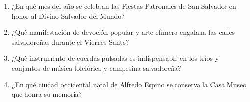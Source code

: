 \documentclass[10pt,a4paper]{article}
\begin{document}
\begin{enumerate}[label=\textbf{\arabic*.}]
\vspace{0.15cm}
\item ¿En qué mes del año se celebran las Fiestas Patronales de San Salvador en honor al Divino Salvador del Mundo?
\begin{enumerate}[label=\textbf{\Alph*)}]
\end{enumerate}
\vspace{0.15cm}
\item ¿Qué manifestación de devoción popular y arte efímero engalana las calles salvadoreñas durante el Viernes Santo?
\begin{enumerate}[label=\textbf{\Alph*)}]
\end{enumerate}
\vspace{0.15cm}
\item ¿Qué instrumento de cuerdas pulsadas es indispensable en los tríos y conjuntos de música folclórica y campesina salvadoreña?
\begin{enumerate}[label=\textbf{\Alph*)}]
\end{enumerate}
\vspace{0.15cm}
\item ¿En qué ciudad occidental natal de Alfredo Espino se conserva la Casa Museo que honra su memoria?
\begin{enumerate}[label=\textbf{\Alph*)}]
\end{enumerate}
\end{enumerate}
\end{document}
